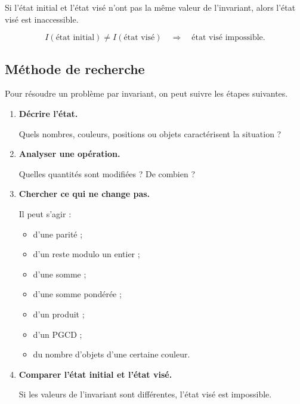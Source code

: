 \documentclass[11pt]{article}
\begin{document}
\begin{proposition}
Si l'état initial et l'état visé n'ont pas la même valeur de l'invariant,
alors l'état visé est inaccessible.

\[
\boxed{
I(\text{état initial})\neq I(\text{état visé})
\quad\Longrightarrow\quad
\text{état visé impossible}.
}
\]
\end{proposition}

\subsection{Méthode de recherche}\label{sec:methode-recherche}

\begin{methode}
Pour résoudre un problème par invariant, on peut suivre les étapes suivantes.

\begin{enumerate}
    \item \textbf{Décrire l'état.}

    Quels nombres, couleurs, positions ou objets caractérisent la situation ?

    \item \textbf{Analyser une opération.}

    Quelles quantités sont modifiées ? De combien ?

    \item \textbf{Chercher ce qui ne change pas.}

    Il peut s'agir :
    \begin{itemize}
        \item d'une parité ;
        \item d'un reste modulo un entier ;
        \item d'une somme ;
        \item d'une somme pondérée ;
        \item d'un produit ;
        \item d'un PGCD ;
        \item du nombre d'objets d'une certaine couleur.
    \end{itemize}

    \item \textbf{Comparer l'état initial et l'état visé.}

    Si les valeurs de l'invariant sont différentes, l'état visé est impossible.
\end{enumerate}
\end{methode}
\end{document}
